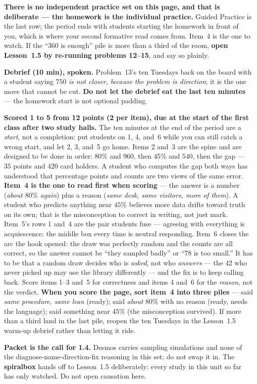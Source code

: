 \documentclass[10pt]{article}
\begin{document}
\begin{teachernote}
\textbf{There is no independent practice set on this page, and that is deliberate --- the
homework is the individual practice.} Guided Practice is the last row; the period
ends with students starting the homework in front of you, which is where your second formative
read comes from. Item~4 is the one to watch. If the ``$360$ is enough'' pile is more than a
third of the room, \textbf{open Lesson~1.5 by re-running problems 12--15}, and say
so plainly.

\textbf{Debrief (10 min), spoken.} Problem~13's ten Tuesdays back on the board with a student saying
\emph{$750$ is not closer, because the problem is direction}; it is the one move that cannot
be cut. \textbf{Do not let the debrief eat the last ten minutes} --- the homework start is not
optional padding.
\end{teachernote}

\begin{teachernote}[Homework]
\textbf{Scored 1 to 5 from 12 points (2 per item), due at the start of the first class after two study
halls.} The ten minutes at the end of the period are a \emph{start}, not a completion: put
students on 1, 4, and~6 while you can still catch a wrong start, and let 2, 3, and~5 go home.
Items 2 and~3 are the spine and are designed to be done in order: $80\%$ and $960$, then $45\%$
and $540$, then the gap --- $35$ points and $420$ card holders. A student who computes the gap
both ways has understood that percentage points and counts are two views of the same error.
\textbf{Item~4 is the one to read first when scoring} --- the answer is a number (\emph{about
$80\%$ again}) plus a reason (\emph{same desk, same visitors, more of them}). A student who
predicts anything near $45\%$ believes more data drifts toward truth on its own; that is the
misconception to correct in writing, not just mark. Item~5's rows 1 and~4 are the pair students
fuse --- agreeing with everything is acquiescence; the middle box every time is neutral
responding. Item~6 closes the arc the hook opened: the draw was perfectly random and the counts
are all correct, so the answer cannot be ``they sampled badly'' or ``$78$ is too small.'' It has
to be that a random draw decides who is \emph{asked}, not who \emph{answers} --- the $42$ who
never picked up may use the library differently --- and the fix is to keep calling back.
Score items 1--3 and~5 for correctness and items 4 and~6 for the \emph{reason}, not the verdict.
\textbf{When you score the page, sort item~4 into three piles} --- said \emph{same procedure,
same lean} (ready); said \emph{about $80\%$} with no reason (ready, needs the language); said
something near $45\%$ (the misconception survived). If more than a third land in the last
pile, reopen the ten Tuesdays in the Lesson~1.5 warm-up debrief rather than letting it ride.

\textbf{Packet is the call for 1.4.} Desmos carries sampling simulations and none of the
diagnose-name-direction-fix reasoning in this set; do not swap it in. The \textbf{spiralbox}
hands off to Lesson~1.5 deliberately: every study in this unit so far has only watched. Do not
open causation here.
\end{teachernote}
\end{document}
